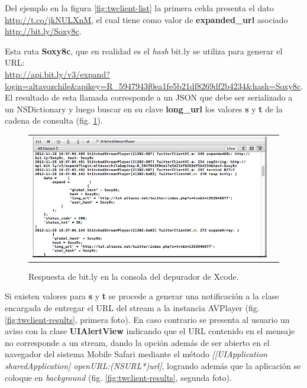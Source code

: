 Del ejemplo en la figura \ref{fig:twclient-list} la primera celda presenta el dato \url{http://t.co/jkNULXnM}, el cual tiene como valor de \textbf{expanded\_url} asociado \url{http://bit.ly/Soxy8c}.

Esta ruta \textbf{Soxy8c}, que en realidad es el \textit{hash} bit.ly se utiliza para generar el URL:\\
\url{http://api.bit.ly/v3/expand?login=altavozchile&apikey=R_5947943f0ea1fe5b21df8269df2b4234&hash=Soxy8c}. \\

El resultado de esta llamada corresponde a un JSON que debe ser serializado a un NSDictionary y luego buscar en su clave \textbf{long\_url} los valores \textbf{s} y \textbf{t} de la cadena de consulta (fig. \ref{fig:twclient-debug}).\\

\begin{figure}[H]
	\centering
	\begin{tabular}{cc}
	\includegraphics[scale=0.55]{imgs/twclient-debug.png}
	\end{tabular}
	\caption{Respuesta de bit.ly en la consola del depurador de Xcode.}
	\label{fig:twclient-debug}
\end{figure}


Si existen valores para \textbf{s} y \textbf{t} se procede a generar una notificación a la clase encargada de entregar el URL del stream a la instancia AVPlayer (fig. \ref{fig:twclient-results}, primera foto). En caso contrario se presenta al usuario un aviso con la clase \textbf{UIAlertView} indicando que el URL contenido en el mensaje no corresponde a un stream, dando la opción además de ser abierto en el navegador del sistema Mobile Safari mediante el método \textit{[[UIApplication sharedApplication] openURL:(NSURL*)url]}, logrando además que la aplicación se coloque en \textit{background} (fig. \ref{fig:twclient-results}, segunda foto).

